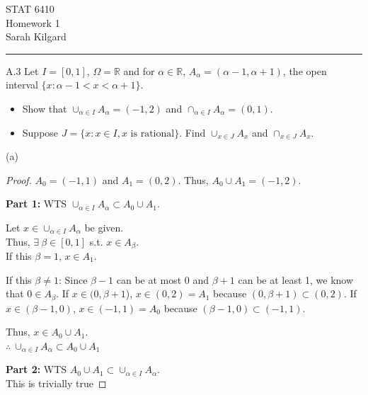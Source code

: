 \documentclass[12pt,letterpaper, onecolumn]{exam}
\newcommand{\real}{\mathbb{R}}
\begin{document}
\begingroup  
    \centering
    \LARGE STAT 6410\\
    \LARGE Homework 1 \\[0.5em]
    \large Sarah Kilgard\par
\endgroup
\rule{\textwidth}{0.4pt}
\pointsdroppedatright   %
\printanswers
\renewcommand{\solutiontitle}{\noindent\textbf{Ans:}\enspace}   %

\begin{questions}

    \question A.3 Let $I=[0,1]$, $\Omega=\real$ and for $\alpha\in \real$, $A_\alpha =(\alpha-1,\alpha+1)$, the open
interval $\{x : \alpha - 1 < x < \alpha + 1\}$.
\begin{itemize}
\item[(a)] Show that $\cup_{\alpha\in I} A_\alpha = (-1, 2)$ and $\cap_{\alpha\in I} A_\alpha = (0, 1)$.
\item[(b)] Suppose $J = \{x : x \in I,x \textrm{ is rational}\}$. Find $\cup_{x\in J}A_x$ and $\cap_{ x\in J} A_x$.
\end{itemize}
    \begin{solution}
    (a) 
    \begin{proof}
        $A_0 = (-1, 1)$ and $A_1 = (0, 2)$. Thus, $A_0 \cup A_1 = (-1, 2).$

        \textbf{Part 1:} WTS $\cup_{\alpha \in I} A_\alpha \subset A_0 \cup A_1$.

        Let $x \in \cup_{\alpha \in I} A_\alpha$ be given. \\
        Thus, $\exists \: \beta \in [0,1]$ s.t. $x \in A_\beta$. 
        \\ If this $\beta = 1$, $x \in A_1$.

        If this $\beta \neq 1$:
        Since $\beta - 1$ can be at most 0 and $\beta + 1$ can be at least 1, we know that $0 \in A_\beta$.
        If $x \in (0, \beta + 1$), $x \in (0, 2) = A_1$ because $(0, \beta + 1) \subset (0, 2)$. 
        If $x \in (\beta - 1, 0)$, $x \in (-1, 1) = A_0$ because $(\beta - 1, 0) \subset (-1, 1)$. 

        Thus, $x \in A_0 \cup A_1$. \\ $
        \therefore \: \cup_{\alpha \in I} A_\alpha \subset A_0 \cup A_1$

        \textbf{Part 2:} WTS $A_0 \cup A_1 \subset \cup_{\alpha \in I} A_\alpha $. \\
        This is trivially true


\end{proof}
\end{solution}
\end{questions}
\end{document}
